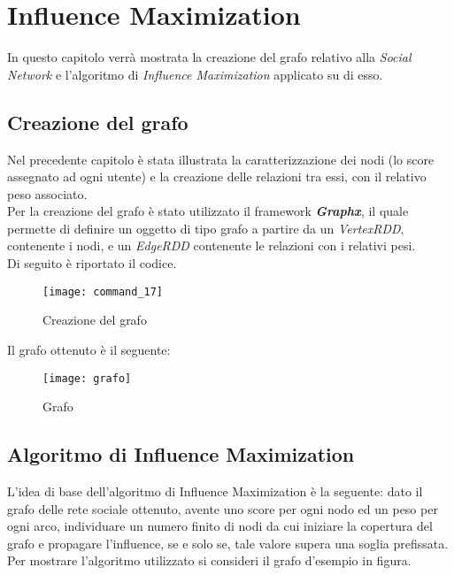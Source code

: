 
\chapter{Influence Maximization}
In questo capitolo verrà mostrata la creazione del grafo relativo alla \textit{Social Network}
e l'algoritmo di \textit{Influence Maximization} applicato su di esso.

\section{Creazione del grafo}
Nel precedente capitolo è stata illustrata la caratterizzazione dei nodi (lo score
assegnato ad ogni utente) e la creazione delle relazioni tra essi, con il relativo
peso associato.\\
Per la creazione del grafo è stato utilizzato il framework \textit{\textbf{Graphx}},
il quale permette di definire un oggetto di tipo grafo a partire da un \textit{VertexRDD},
contenente i nodi, e un \textit{EdgeRDD} contenente le relazioni con i relativi pesi.\\
Di seguito è riportato il codice.

\begin{figure}[!htbp]
	\texttt{[image: command\_17]}
	\caption{Creazione del grafo}
	\label{command_17}
\end{figure}
\clearpage

Il grafo ottenuto è il seguente:\\
\begin{figure}[!htbp]
	\texttt{[image: grafo]}
	\caption{Grafo}
	\label{grafo}
\end{figure}
\clearpage
\section{Algoritmo di Influence Maximization}
L'idea di base dell'algoritmo di Influence Maximization è la seguente: dato il
grafo delle rete sociale ottenuto, avente uno score per ogni nodo ed un peso per
ogni arco, individuare un numero finito di nodi da cui iniziare la copertura del
grafo e propagare l'influence, se e solo se, tale valore supera una soglia prefissata.\\
Per mostrare l'algoritmo utilizzato si consideri il grafo d'esempio in figura.

